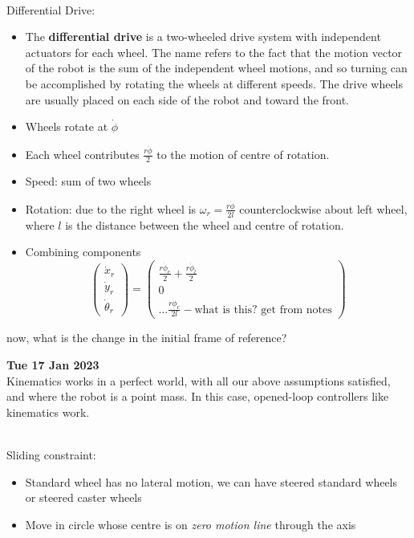 \documentclass[13pt]{article}
\begin{document}
\hfill \\
\noindent
Differential Drive:
\begin{itemize}
	\item The \textbf{differential drive} is a two-wheeled drive system with independent actuators for each wheel. The name
		refers to the fact that the motion vector of the robot is the sum of the independent wheel motions, and so
		turning can be accomplished by rotating the wheels at different speeds. The drive
		wheels are usually placed on each side of the robot and toward the front.
	\item Wheels rotate at $\dot \phi$
	\item Each wheel contributes $\frac{r \dot \phi}{2}$ to the motion of centre of rotation.
	\item Speed: sum of two wheels
	\item Rotation: due to the right wheel is $\omega_{r} = \frac{r \dot \phi}{2 l}$ counterclockwise about left wheel,
		where $l$ is the distance between the wheel and centre of rotation.
	\item Combining components
	\begin{equation}
		\begin{pmatrix} \dot x_{r} \\ \dot y_{r} \\ \dot \theta_{r} \end{pmatrix}  = \begin{pmatrix} \frac{r \dot
	\phi_{r}}{2} + \frac{r \dot \phi_{l}}{2} \\ 0 \\ \ldots \frac{r\dot \phi_{r}}{2l} - \text{what is this? get from notes} \end{pmatrix}
	\end{equation}
\end{itemize}
now, what is the change in the initial frame of reference?


\hfill

\hfill \textbf{Tue 17 Jan 2023} \\

\noindent
Kinematics works in a perfect world, with all our above assumptions satisfied, and where the robot is a point mass. In
this case, opened-loop controllers like kinematics work.

\hfill \\

\noindent
Sliding constraint:
\begin{itemize}
	\item Standard wheel has no lateral motion, we can have steered standard wheels or steered caster wheels
	\item Move in circle whose centre is on \textit{zero motion line} through the axis
\end{itemize}
\end{document}
